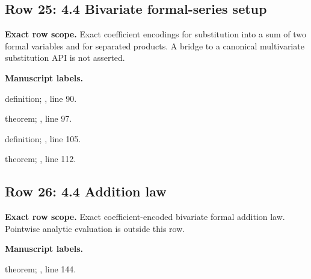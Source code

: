 \subsection{Row 25: 4.4 Bivariate formal-series setup}
\label{row:25}
\textbf{Exact row scope.} Exact coefficient encodings for substitution into a sum of two formal variables and for separated products. A bridge to a canonical multivariate substitution API is not asserted.\par\smallskip
\textbf{Manuscript labels.} \par\smallskip
{\small{}\par}
{\footnotesize\color{muted}definition; , line 90.\par}\smallskip
{\small{}\par}
{\footnotesize\color{muted}theorem; , line 97.\par}\smallskip
{\small{}\par}
{\footnotesize\color{muted}definition; , line 105.\par}\smallskip
{\small{}\par}
{\footnotesize\color{muted}theorem; , line 112.\par}\smallskip
{}
\subsection{Row 26: 4.4 Addition law}
\label{row:26}
\textbf{Exact row scope.} Exact coefficient-encoded bivariate formal addition law. Pointwise analytic evaluation is outside this row.\par\smallskip
\textbf{Manuscript labels.} \par\smallskip
{\small{}\par}
{\footnotesize\color{muted}theorem; , line 144.\par}\smallskip
{}
